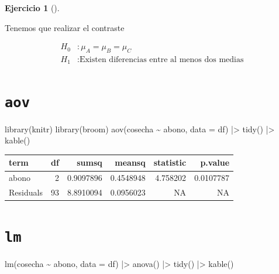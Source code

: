 \documentclass[
  a4paper,
]{scrreport}
\newenvironment{Shaded}{\begin{snugshade}}{\end{snugshade}}
\newcommand{\AttributeTok}[1]{\textcolor[rgb]{0.40,0.45,0.13}{#1}}
\newcommand{\FunctionTok}[1]{\textcolor[rgb]{0.28,0.35,0.67}{#1}}
\newcommand{\NormalTok}[1]{\textcolor[rgb]{0.00,0.23,0.31}{#1}}
\newcommand{\SpecialCharTok}[1]{\textcolor[rgb]{0.37,0.37,0.37}{#1}}
\theoremstyle{definition}
\newtheorem{exercise}{Ejercicio}[chapter]
\theoremstyle{remark}
\begin{document}
\begin{exercise}[]
\begin{enumerate}
\begin{tcolorbox}
  Tenemos que realizar el contraste

  \begin{align*}
  H_0 &: \mu_A = \mu_B = \mu_C \\
  H_1 &: \mbox{Existen diferencias entre al menos dos medias}
  \end{align*}

  \section{\texorpdfstring{\texttt{aov}}{aov}}

\begin{Shaded}
\begin{Highlighting}[]
\FunctionTok{library}\NormalTok{(knitr)}
\FunctionTok{library}\NormalTok{(broom)}
\FunctionTok{aov}\NormalTok{(cosecha }\SpecialCharTok{\textasciitilde{}}\NormalTok{ abono, }\AttributeTok{data =}\NormalTok{ df) }\SpecialCharTok{|\textgreater{}} 
    \FunctionTok{tidy}\NormalTok{() }\SpecialCharTok{|\textgreater{}} 
    \FunctionTok{kable}\NormalTok{()}
\end{Highlighting}
\end{Shaded}

  \begin{longtable}[]{@{}lrrrrr@{}}
  \toprule\noalign{}
  term & df & sumsq & meansq & statistic & p.value \\
  \midrule\noalign{}
  \endhead
  \bottomrule\noalign{}
  \endlastfoot
  abono & 2 & 0.9097896 & 0.4548948 & 4.758202 & 0.0107787 \\
  Residuals & 93 & 8.8910094 & 0.0956023 & NA & NA \\
  \end{longtable}

  \section{\texorpdfstring{\texttt{lm}}{lm}}

\begin{Shaded}
\begin{Highlighting}[]
\FunctionTok{lm}\NormalTok{(cosecha }\SpecialCharTok{\textasciitilde{}}\NormalTok{ abono, }\AttributeTok{data =}\NormalTok{ df) }\SpecialCharTok{|\textgreater{}} 
    \FunctionTok{anova}\NormalTok{() }\SpecialCharTok{|\textgreater{}} 
    \FunctionTok{tidy}\NormalTok{() }\SpecialCharTok{|\textgreater{}} 
    \FunctionTok{kable}\NormalTok{()}
\end{Highlighting}
\end{Shaded}


\end{tcolorbox}
\end{enumerate}
\end{exercise}
\end{document}
